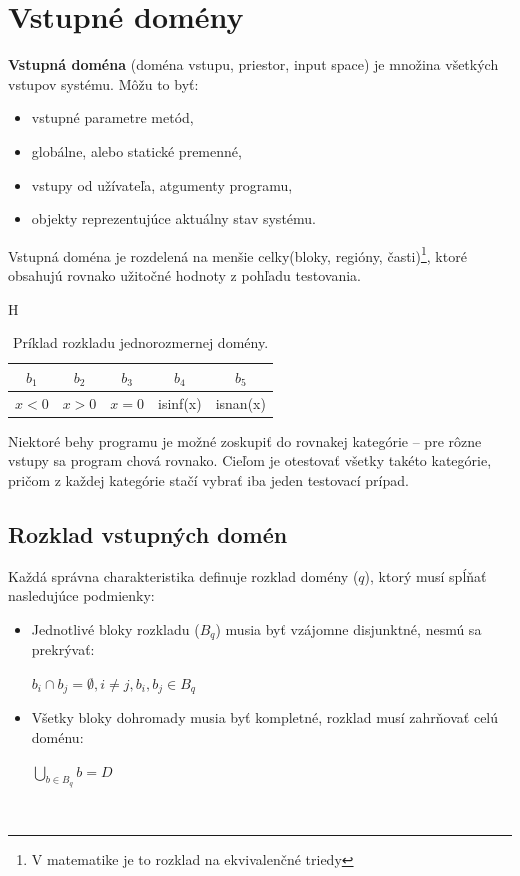 \section{Vstupné domény}
\label{vstupne_domeny}
\textbf{Vstupná doména} (doména vstupu, priestor, input space) je množina všetkých vstupov systému.
Môžu to byť:
\begin{itemize}
	\item vstupné parametre metód,
	\item globálne, alebo statické premenné,
	\item vstupy od užívateľa, atgumenty programu,
	\item objekty reprezentujúce aktuálny stav systému.
\end{itemize}
Vstupná doména je rozdelená na menšie celky(bloky, regióny, časti)\footnote{V matematike je to rozklad na ekvivalenčné triedy}, ktoré obsahujú rovnako užitočné hodnoty z pohľadu testovania.
\begin{table}{H}
	\centering
	\begin{tabular}{ | c | c | c | c | c | }
		\hline
		$b_1$ & $b_2$ & $b_3$ & $b_4$ & $b_5$ \\
		\hline
		$x < 0$ & $x > 0$ & $x = 0$ & isinf(x) & isnan(x) \\
		\hline
	\end{tabular}
	\caption{Príklad rozkladu jednorozmernej domény.}
\end{table}

Niektoré behy programu je možné zoskupiť do rovnakej kategórie -- pre rôzne vstupy sa program chová rovnako.
Cieľom je otestovať všetky takéto kategórie, pričom z každej kategórie stačí vybrať iba jeden testovací prípad.

\subsection*{Rozklad vstupných domén}
\label{rozklad_domen}
Každá správna charakteristika definuje rozklad domény ($q$), ktorý musí spĺňať nasledujúce podmienky:
\begin{itemize}
	\item Jednotlivé bloky rozkladu ($B_q$) musia byť vzájomne disjunktné, nesmú sa prekrývať:
		\begin{center}
			$b_i \cap b_j = \emptyset, i \not = j, b_i, b_j \in B_q$
		\end{center}
	\item Všetky bloky dohromady musia byť kompletné, rozklad musí zahrňovať celú doménu:
		\begin{center}
			$\underset{b \in B_q}{\bigcup} b = D$
		\end{center}
\end{itemize}
\\

